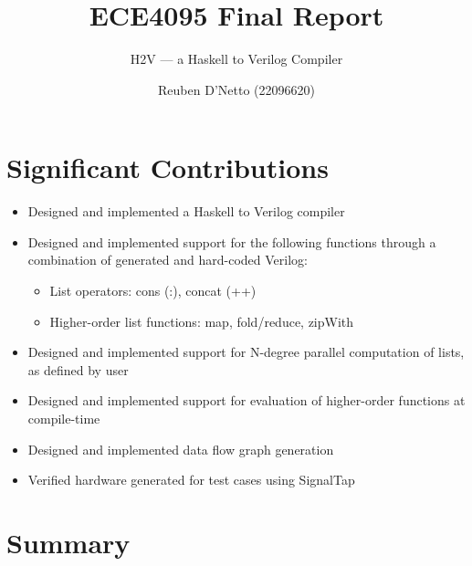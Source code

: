 \documentclass[english,onecolumn]{scrartcl}
\begin{document}
\title{ECE4095 Final Report}
\subtitle{H2V --- a Haskell to Verilog Compiler}
\author{Reuben D'Netto (22096620)}

\maketitle
\tableofcontents{}
\pagebreak{}


\section{Significant Contributions}
\begin{itemize}
    \item Designed and implemented a Haskell to Verilog compiler
    \item Designed and implemented support for the following functions through a combination of generated and hard-coded Verilog:
        \begin{itemize}
            \item List operators: cons (:), concat (++)
            \item Higher-order list functions: map, fold/reduce, zipWith
        \end{itemize}
    \item Designed and implemented support for N-degree parallel computation of lists, as defined by user
    \item Designed and implemented support for evaluation of higher-order functions at compile-time
    \item Designed and implemented data flow graph generation
    \item Verified hardware generated for test cases using SignalTap
\end{itemize}

\newcommand\invisiblesection[1]{%
    \refstepcounter{section}%
    \addcontentsline{toc}{section}{\protect\numberline{\thesection}#1}%
    \sectionmark{#1}}

\begin{titlepage}

\end{titlepage}


\section{Summary}
\end{document}
